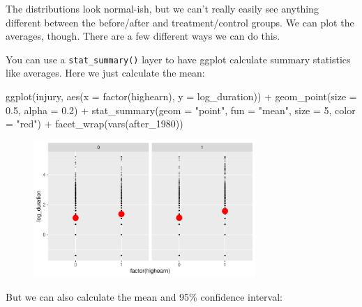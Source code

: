 \documentclass[
  letterpaper,
  DIV=11,
  numbers=noendperiod]{scrartcl}
\newenvironment{Shaded}{\begin{snugshade}}{\end{snugshade}}
\newcommand{\AttributeTok}[1]{\textcolor[rgb]{0.40,0.45,0.13}{#1}}
\newcommand{\DecValTok}[1]{\textcolor[rgb]{0.68,0.00,0.00}{#1}}
\newcommand{\FloatTok}[1]{\textcolor[rgb]{0.68,0.00,0.00}{#1}}
\newcommand{\FunctionTok}[1]{\textcolor[rgb]{0.28,0.35,0.67}{#1}}
\newcommand{\NormalTok}[1]{\textcolor[rgb]{0.00,0.23,0.31}{#1}}
\newcommand{\SpecialCharTok}[1]{\textcolor[rgb]{0.37,0.37,0.37}{#1}}
\newcommand{\StringTok}[1]{\textcolor[rgb]{0.13,0.47,0.30}{#1}}
\begin{document}
The distributions look normal-ish, but we can't really easily see
anything different between the before/after and treatment/control
groups. We can plot the averages, though. There are a few different ways
we can do this.

You can use a \texttt{stat\_summary()} layer to have ggplot calculate
summary statistics like averages. Here we just calculate the mean:

\begin{Shaded}
\begin{Highlighting}[]
\FunctionTok{ggplot}\NormalTok{(injury, }\FunctionTok{aes}\NormalTok{(}\AttributeTok{x =} \FunctionTok{factor}\NormalTok{(highearn), }\AttributeTok{y =}\NormalTok{ log\_duration)) }\SpecialCharTok{+}
  \FunctionTok{geom\_point}\NormalTok{(}\AttributeTok{size =} \FloatTok{0.5}\NormalTok{, }\AttributeTok{alpha =} \FloatTok{0.2}\NormalTok{) }\SpecialCharTok{+}
  \FunctionTok{stat\_summary}\NormalTok{(}\AttributeTok{geom =} \StringTok{"point"}\NormalTok{, }\AttributeTok{fun =} \StringTok{"mean"}\NormalTok{, }\AttributeTok{size =} \DecValTok{5}\NormalTok{, }\AttributeTok{color =} \StringTok{"red"}\NormalTok{) }\SpecialCharTok{+}
  \FunctionTok{facet\_wrap}\NormalTok{(}\FunctionTok{vars}\NormalTok{(after\_1980))}
\end{Highlighting}
\end{Shaded}

\begin{figure}[H]

{\centering \includegraphics[width=0.75\textwidth,height=\textheight]{DD_wooldridge_injury_files/figure-pdf/plot-means-with-points-1.pdf}

}

\end{figure}

But we can also calculate the mean and 95\% confidence interval:
\end{document}
